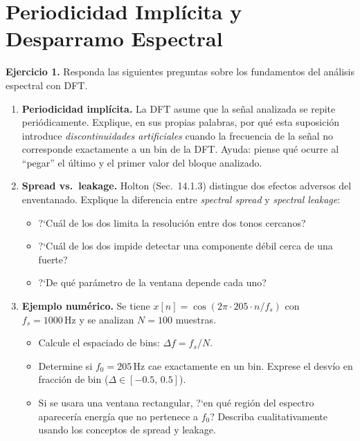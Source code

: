 \documentclass[11pt, a4paper]{article}
\begin{document}
\section{Periodicidad Impl\'icita y Desparramo Espectral}

\begin{exbox}
\textbf{Ejercicio 1.}
Responda las siguientes preguntas sobre los fundamentos del an\'alisis espectral con DFT.

\begin{enumerate}[label=\textbf{\alph*)}]

  \item \textbf{Periodicidad impl\'icita.}
  La DFT asume que la se\~nal analizada se repite peri\'odicamente.
  Explique, en sus propias palabras, por qu\'e esta suposici\'on introduce
  \emph{discontinuidades artificiales} cuando la frecuencia de la se\~nal
  no corresponde exactamente a un bin de la DFT.
  Ayuda: piense qu\'e ocurre al ``pegar'' el \'ultimo y el primer valor del bloque analizado.

  \item \textbf{Spread vs.\ leakage.}
  Holton (Sec.~14.1.3) distingue dos efectos adversos del enventanado.
  Explique la diferencia entre \emph{spectral spread} y \emph{spectral leakage}:
  \begin{itemize}[noitemsep]
    \item ?`Cu\'al de los dos limita la resoluci\'on entre dos tonos cercanos?
    \item ?`Cu\'al de los dos impide detectar una componente d\'ebil cerca de una fuerte?
    \item ?`De qu\'e par\'ametro de la ventana depende cada uno?
  \end{itemize}

  \item \textbf{Ejemplo num\'erico.}
  Se tiene $x[n] = \cos(2\pi \cdot 205 \cdot n/f_s)$ con $f_s = 1000\,\text{Hz}$
  y se analizan $N = 100$ muestras.
  \begin{itemize}[noitemsep]
    \item Calcule el espaciado de bins: $\Delta f = f_s/N$.
    \item Determine si $f_0 = 205\,\text{Hz}$ cae exactamente en un bin.
      Exprese el desvío en fracci\'on de bin ($\Delta \in [-0.5,\, 0.5]$).
    \item Si se usara una ventana rectangular, ?`en qu\'e regi\'on del espectro
      aparecería energía que no pertenece a $f_0$?
      Describa cualitativamente usando los conceptos de spread y leakage.
  \end{itemize}

\end{enumerate}
\end{exbox}
\end{document}
